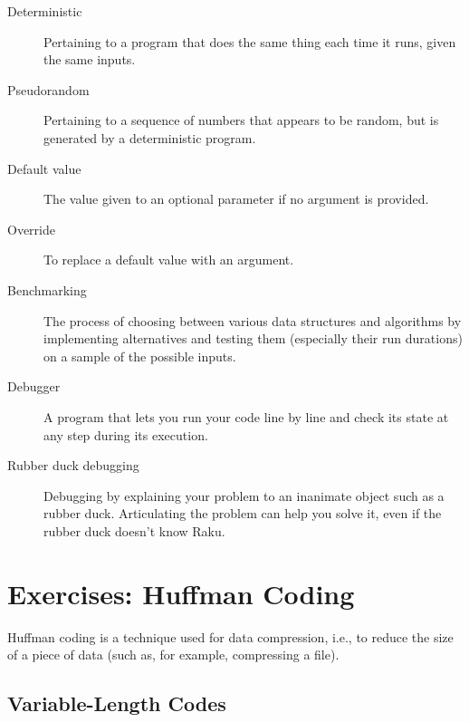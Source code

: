 \begin{description}

\item[Deterministic] Pertaining to a program that does the same
thing each time it runs, given the same inputs.

\item[Pseudorandom] Pertaining to a sequence of numbers that appears
to be random, but is generated by a deterministic program.

\item[Default value] The value given to an optional parameter if no
argument is provided.

\item[Override] To replace a default value with an argument.

\item[Benchmarking] The process of choosing between various data 
structures and algorithms by implementing alternatives and testing 
them (especially their run durations) on a sample of the possible inputs.  

\item[Debugger] A program that lets you run your code line by 
line and check its state at any step during its execution.

\item[Rubber duck debugging] Debugging by explaining your problem
to an inanimate object such as a rubber duck.  Articulating the
problem can help you solve it, even if the rubber duck 
doesn't know Raku. 

\end{description}



\section{Exercises: Huffman Coding}
\label{huffman_exercise}

Huffman coding is a technique used for data compression, i.e., 
to reduce the size of a piece of data (such as, for example, 
compressing a file).

\subsection{Variable-Length Codes}

